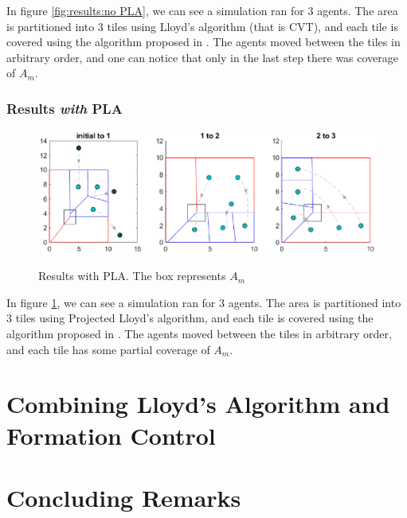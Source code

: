 \documentclass{iacas}
\begin{document}
In figure \ref{fig:results:no PLA}, we can see a simulation ran for 3 agents. The area is partitioned into 3 tiles using Lloyd's algorithm (that is CVT), and each tile is covered using the algorithm proposed in \cite{Cortes2004}. The agents moved between the tiles in arbitrary order, and one can notice that only in the last step there was coverage of $A_m$.

\subsubsection{Results \emph{with} PLA}
\begin{figure}[H]
\includegraphics[scale=0.8]{figures/proposed-sol/results/sim2-3agents-3partitions-PLA.eps}
\label{fig:results:PLA}
\caption{Results with PLA. The box represents $A_m$}
\end{figure}

In figure \ref{fig:results:PLA}, we can see a simulation ran for 3 agents. The area is partitioned into 3 tiles using Projected Lloyd's algorithm, and each tile is covered using the algorithm proposed in \cite{Cortes2004}. The agents moved between the tiles in arbitrary order, and each tile has some partial coverage of $A_m$.

\section{Combining Lloyd's Algorithm and Formation Control}

\section{Concluding Remarks}


\end{document}
